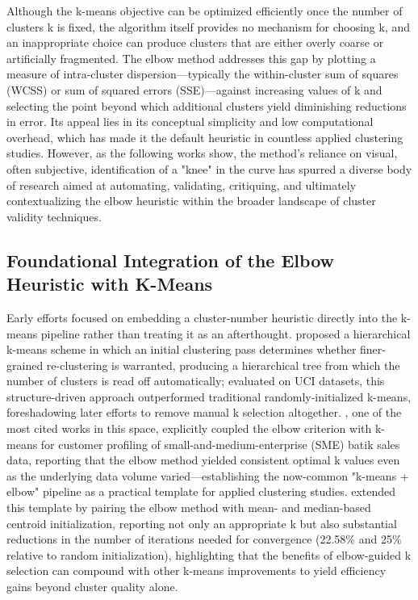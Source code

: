 Although the k-means objective can be optimized efficiently once the number of clusters k is fixed, the algorithm itself provides no mechanism for choosing k, and an inappropriate choice can produce clusters that are either overly coarse or artificially fragmented. The elbow method addresses this gap by plotting a measure of intra-cluster dispersion---typically the within-cluster sum of squares (WCSS) or sum of squared errors (SSE)---against increasing values of k and selecting the point beyond which additional clusters yield diminishing reductions in error. Its appeal lies in its conceptual simplicity and low computational overhead, which has made it the default heuristic in countless applied clustering studies. However, as the following works show, the method's reliance on visual, often subjective, identification of a "knee" in the curve has spurred a diverse body of research aimed at automating, validating, critiquing, and ultimately contextualizing the elbow heuristic within the broader landscape of cluster validity techniques.

\subsection{Foundational Integration of the Elbow Heuristic with K-Means}
Early efforts focused on embedding a cluster-number heuristic directly into the k-means pipeline rather than treating it as an afterthought. \cite{wei2013improved} proposed a hierarchical k-means scheme in which an initial clustering pass determines whether finer-grained re-clustering is warranted, producing a hierarchical tree from which the number of clusters is read off automatically; evaluated on UCI datasets, this structure-driven approach outperformed traditional randomly-initialized k-means, foreshadowing later efforts to remove manual k selection altogether. \cite{syakur2018integration}, one of the most cited works in this space, explicitly coupled the elbow criterion with k-means for customer profiling of small-and-medium-enterprise (SME) batik sales data, reporting that the elbow method yielded consistent optimal k values even as the underlying data volume varied---establishing the now-common "k-means + elbow" pipeline as a practical template for applied clustering studies. \cite{umargono2020means} extended this template by pairing the elbow method with mean- and median-based centroid initialization, reporting not only an appropriate k but also substantial reductions in the number of iterations needed for convergence (22.58\% and 25\% relative to random initialization), highlighting that the benefits of elbow-guided k selection can compound with other k-means improvements to yield efficiency gains beyond cluster quality alone.

